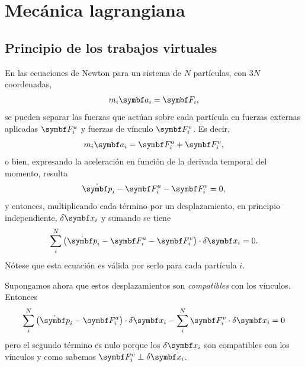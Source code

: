 \documentclass[10pt,oneside]{CBFT_book}
\begin{document}
\chapter{Mecánica lagrangiana}

\section{Principio de los trabajos virtuales}

En las ecuaciones de Newton para un sistema de $N$ partículas, con $3N$ coordenadas,
\[
	m_i \vb{a}_i = \vb{F}_i,
\]
se pueden separar las fuerzas que actúan sobre cada partícula en fuerzas externas aplicadas $ \vb{F}_i^a $
y fuerzas de vínculo $ \vb{F}_i^v $. Es decir,
\[
	m_i \vb{a}_i = \vb{F}_i^a + \vb{F}_i^v,
\]
o bien, expresando la aceleración en función de la derivada temporal del momento, 
resulta 
\[
	\dot{\vb{p}}_i - \vb{F}_i^a - \vb{F}_i^v = 0,
\]
y entonces, multiplicando cada término por un desplazamiento, en principio independiente, $ \delta\vb{x}_i $ y sumando se tiene
\[
	\sum_i^N \left( \dot{\vb{p}}_i - \vb{F}_i^a - \vb{F}_i^v \right) \cdot \delta\vb{x}_i  = 0.
\]
Nótese que esta ecuación es válida por serlo para cada partícula $i$.

Supongamos ahora que estos desplazamientos son {\it compatibles} con los vínculos. Entonces
\[
	\sum_i^N \left( \dot{\vb{p}}_i - \vb{F}_i^a \right) \cdot \delta\vb{x}_i 
	- \sum_i^N  \vb{F}_i^v  \cdot \delta\vb{x}_i  = 0
\]
pero el segundo término es nulo porque los $ \delta\vb{x}_i $ son compatibles con los vínculos y como sabemos 
$ \vb{F}_i^v \perp \delta\vb{x}_i $.
\end{document}
